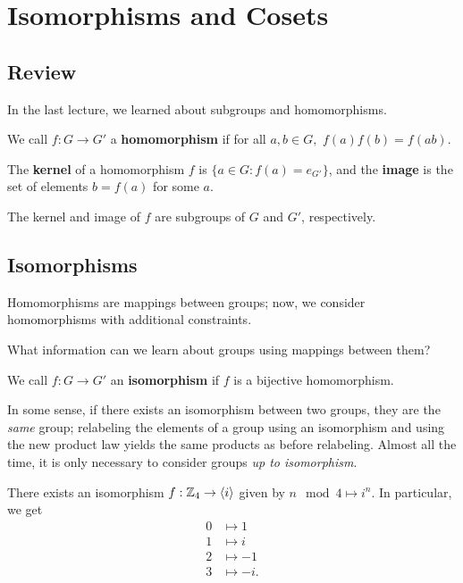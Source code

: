 
\section{Isomorphisms and Cosets}

\subsection{Review}
In the last lecture, we learned about subgroups and homomorphisms.  

\begin{definition}
We call $f: G \rightarrow G'$ a \textbf{homomorphism} if for all $a, b \in G,$ $f(a)f(b) = f(ab).$ 
\end{definition}
\begin{definition}
The \textbf{kernel} of a homomorphism $f$ is $\{a \in G : f(a) = e_{G'}\}$, and the \textbf{image} is the set of elements $b = f(a)$ for some $a.$
\end{definition}

The kernel and image of $f$ are subgroups of $G$ and $G'$, respectively. 

\subsection{Isomorphisms}

Homomorphisms are mappings between groups; now, we consider homomorphisms with additional constraints.
\begin{qq}
What information can we learn about groups using mappings between them?
\end{qq}
\begin{definition}
We call $f: G \rightarrow G'$ an \textbf{isomorphism} if $f$ is a bijective homomorphism. 
\end{definition}

In some sense, if there exists an isomorphism between two groups, they are the \emph{same} group; relabeling the elements of a group using an isomorphism and using the new product law yields the same products as before relabeling. Almost all the time, it is only necessary to consider groups \emph{up to isomorphism}.
\begin{example}
There exists an isomorphism $f: \mathbb Z_4 \rightarrow \langle i \rangle$ given by $n \mod 4 \mapsto i^n.$ In particular, we get 
\begin{align*}
    0 &\mapsto 1 \\
    1 &\mapsto i \\
    2 &\mapsto -1 \\
    3 &\mapsto -i.
\end{align*}
\end{example}

